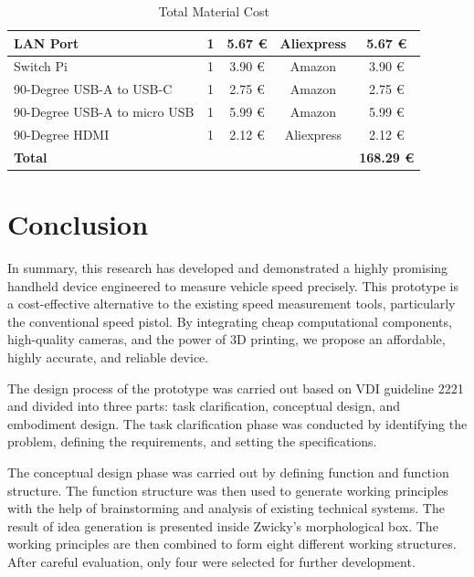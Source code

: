 \begin{table}[!ht]
\begin{tabular}{|l|c|c|c|c|}
        LAN Port                     & 1               & 5.67 €         & Aliexpress       & 5.67 €               \\ \hline
        Switch Pi                    & 1               & 3.90 €         & Amazon           & 3.90 €               \\ \hline
        90-Degree USB-A to USB-C     & 1               & 2.75 €         & Amazon           & 2.75 €               \\ \hline
        90-Degree USB-A to micro USB & 1               & 5.99 €         & Amazon           & 5.99 €               \\ \hline
        90-Degree HDMI               & 1               & 2.12 €         & Aliexpress       & 2.12 €               \\ \hline
        \textbf{Total}               & ~               & ~              & ~                & \textbf{168.29 €}    \\ \hline
    \end{tabular}
    \caption{Total Material Cost}
    \label{tab:totalmaterialcost}
\end{table}


\chapter{Conclusion}
In summary, this research has developed and demonstrated a highly promising handheld device engineered to measure vehicle speed precisely. This prototype is a cost-effective alternative to the existing speed measurement tools, particularly the conventional speed pistol. By integrating cheap computational components, high-quality cameras, and the power of 3D printing, we propose an affordable, highly accurate, and reliable device.

The design process of the prototype was carried out based on VDI guideline 2221 and divided into three parts: task clarification, conceptual design, and embodiment design. The task clarification phase was conducted by identifying the problem, defining the requirements, and setting the specifications.

The conceptual design phase was carried out by defining function and function structure. The function structure was then used to generate working principles with the help of brainstorming and analysis of existing technical systems. The result of idea generation is presented inside Zwicky's morphological box. The working principles are then combined to form eight different working structures. After careful evaluation, only four were selected for further development.

